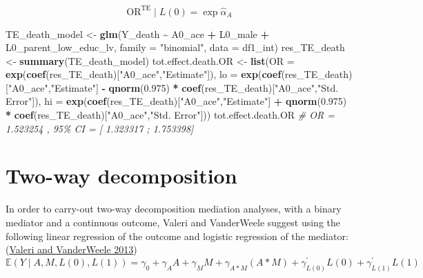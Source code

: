 \documentclass[
]{book}
\newenvironment{Shaded}{\begin{snugshade}}{\end{snugshade}}
\newcommand{\AttributeTok}[1]{\textcolor[rgb]{0.13,0.29,0.53}{#1}}
\newcommand{\CommentTok}[1]{\textcolor[rgb]{0.56,0.35,0.01}{\textit{#1}}}
\newcommand{\FloatTok}[1]{\textcolor[rgb]{0.00,0.00,0.81}{#1}}
\newcommand{\FunctionTok}[1]{\textcolor[rgb]{0.13,0.29,0.53}{\textbf{#1}}}
\newcommand{\NormalTok}[1]{#1}
\newcommand{\OtherTok}[1]{\textcolor[rgb]{0.56,0.35,0.01}{#1}}
\newcommand{\SpecialCharTok}[1]{\textcolor[rgb]{0.81,0.36,0.00}{\textbf{#1}}}
\newcommand{\StringTok}[1]{\textcolor[rgb]{0.31,0.60,0.02}{#1}}
\begin{document}
\[ \text{OR}^{\text{TE}} \mid L(0) = \exp \hat{\alpha}_A \]

\begin{Shaded}
\begin{Highlighting}[]
\NormalTok{TE\_death\_model }\OtherTok{\textless{}{-}} \FunctionTok{glm}\NormalTok{(Y\_death }\SpecialCharTok{\textasciitilde{}}\NormalTok{ A0\_ace }\SpecialCharTok{+}\NormalTok{ L0\_male }\SpecialCharTok{+}\NormalTok{ L0\_parent\_low\_educ\_lv,}
                      \AttributeTok{family =} \StringTok{"binomial"}\NormalTok{,}
                      \AttributeTok{data =}\NormalTok{ df1\_int)}
\NormalTok{res\_TE\_death }\OtherTok{\textless{}{-}} \FunctionTok{summary}\NormalTok{(TE\_death\_model)}
\NormalTok{tot.effect.death.OR }\OtherTok{\textless{}{-}} \FunctionTok{list}\NormalTok{(}\AttributeTok{OR =} \FunctionTok{exp}\NormalTok{(}\FunctionTok{coef}\NormalTok{(res\_TE\_death)[}\StringTok{"A0\_ace"}\NormalTok{,}\StringTok{"Estimate"}\NormalTok{]),}
                            \AttributeTok{lo =} \FunctionTok{exp}\NormalTok{(}\FunctionTok{coef}\NormalTok{(res\_TE\_death)[}\StringTok{"A0\_ace"}\NormalTok{,}\StringTok{"Estimate"}\NormalTok{] }\SpecialCharTok{{-}}
                                       \FunctionTok{qnorm}\NormalTok{(}\FloatTok{0.975}\NormalTok{) }\SpecialCharTok{*}
                                       \FunctionTok{coef}\NormalTok{(res\_TE\_death)[}\StringTok{"A0\_ace"}\NormalTok{,}\StringTok{"Std. Error"}\NormalTok{]),}
                            \AttributeTok{hi =} \FunctionTok{exp}\NormalTok{(}\FunctionTok{coef}\NormalTok{(res\_TE\_death)[}\StringTok{"A0\_ace"}\NormalTok{,}\StringTok{"Estimate"}\NormalTok{] }\SpecialCharTok{+}
                                       \FunctionTok{qnorm}\NormalTok{(}\FloatTok{0.975}\NormalTok{) }\SpecialCharTok{*}
                                       \FunctionTok{coef}\NormalTok{(res\_TE\_death)[}\StringTok{"A0\_ace"}\NormalTok{,}\StringTok{"Std. Error"}\NormalTok{]))}
\NormalTok{tot.effect.death.OR}
\CommentTok{\# OR = 1.523254 , 95\% CI = [ 1.323317 ; 1.753398]}
\end{Highlighting}
\end{Shaded}

\hypertarget{trad2way}{%
\section{Two-way decomposition}\label{trad2way}}

In order to carry-out two-way decomposition mediation analyses, with a binary mediator and a continuous outcome, Valeri and VanderWeele suggest using the following linear regression of the outcome and logistic regression of the mediator:(\protect\hyperlink{ref-valeri2013}{Valeri and VanderWeele 2013})
\begin{equation}
\mathbb{E}(Y \mid A, M,L(0),L(1)) = \gamma_0 + \gamma_A A + \gamma_M M + \gamma_{A \ast M} (A \ast M) + \gamma_{L(0)}^\prime L(0) + \gamma_{L(1)}^\prime L(1) 
\label{eq:contoutcomereg}
\end{equation}
\end{document}
